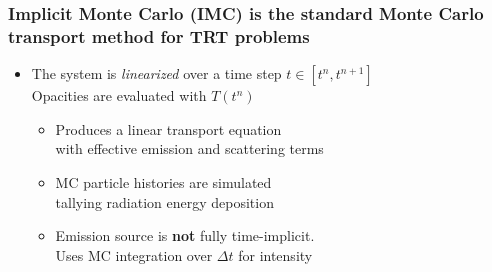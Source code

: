 \documentclass[xcolor=dvipsnames,hyperref={pdfpagelabels=false},unknownkeysallowed]{beamer}
\newcommand{\colG}[1]{{\color{Gray!110} #1}}
\newlength{\wideitemsep}
\let\olditem\item
\renewcommand{\item}{\setlength{\itemsep}{\wideitemsep}\olditem}
\begin{document}
\begin{frame}
    \frametitle{Implicit Monte Carlo (IMC) is the standard Monte Carlo transport method for TRT problems}
        \vspace{-0.2in}
\begin{itemize}
    \item[] The system is \emph{linearized} over a time step $t\in[t^n,t^{n+1}]$ \\ 
        \colG{Opacities are evaluated with $T(t^n)$}\vspace{0.21in}
\setlength\wideitemsep{0.2in}
    \begin{itemize}
        \item Produces a linear transport equation
               \\ \colG{with effective emission and scattering terms}
        \item MC particle histories are simulated 
            \\ \colG{tallying radiation energy deposition}
        \item Emission source is \textbf{not} fully time-implicit.\\
            \colG{Uses MC integration over $\Delta t$ for intensity}
    \end{itemize}
\end{itemize}
\end{frame}
\end{document}

